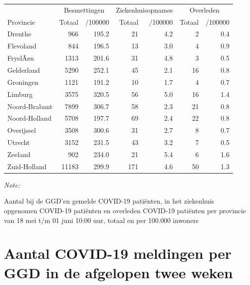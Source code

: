\documentclass[
  english,
  man,floatsintext]{apa6}
\begin{document}
\begin{table}
\centering
\begin{threeparttable}
\begin{tabular}{lrrrrrr}
\toprule
\multicolumn{1}{c}{ } & \multicolumn{2}{c}{Besmettingen} & \multicolumn{2}{c}{Ziekenhuisopnames} & \multicolumn{2}{c}{Overleden} \\
\cmidrule(l{3pt}r{3pt}){2-3} \cmidrule(l{3pt}r{3pt}){4-5} \cmidrule(l{3pt}r{3pt}){6-7}
Provincie & Totaal & /100000 & Totaal & /100000 & Totaal & /100000\\
\midrule
Drenthe & 966 & 195.2 & 21 & 4.2 & 2 & 0.4\\
Flevoland & 844 & 196.5 & 13 & 3.0 & 4 & 0.9\\
FryslÃ¢n & 1313 & 201.6 & 31 & 4.8 & 3 & 0.5\\
Gelderland & 5290 & 252.1 & 45 & 2.1 & 16 & 0.8\\
Groningen & 1121 & 191.2 & 10 & 1.7 & 4 & 0.7\\
Limburg & 3575 & 320.5 & 56 & 5.0 & 16 & 1.4\\
Noord-Brabant & 7899 & 306.7 & 58 & 2.3 & 21 & 0.8\\
Noord-Holland & 5708 & 197.7 & 69 & 2.4 & 22 & 0.8\\
Overijssel & 3508 & 300.6 & 31 & 2.7 & 8 & 0.7\\
Utrecht & 3152 & 231.5 & 43 & 3.2 & 7 & 0.5\\
Zeeland & 902 & 234.0 & 21 & 5.4 & 6 & 1.6\\
Zuid-Holland & 11183 & 299.9 & 171 & 4.6 & 50 & 1.3\\
\bottomrule
\end{tabular}
\begin{tablenotes}
\item \textit{Note: } 
\item Aantal bij de GGD’en gemelde COVID-19 patiënten, in het ziekenhuis opgenomen COVID-19 patiënten en overleden COVID-19 patiënten per provincie van 18 mei t/m 01 juni 10:00 uur, totaal en per 100.000 inwoners
\end{tablenotes}
\end{threeparttable}
\end{table}

\newpage

\hypertarget{aantal-covid-19-meldingen-per-ggd-in-de-afgelopen-twee-weken}{%
\section{Aantal COVID-19 meldingen per GGD in de afgelopen twee weken}\label{aantal-covid-19-meldingen-per-ggd-in-de-afgelopen-twee-weken}}
\end{document}
